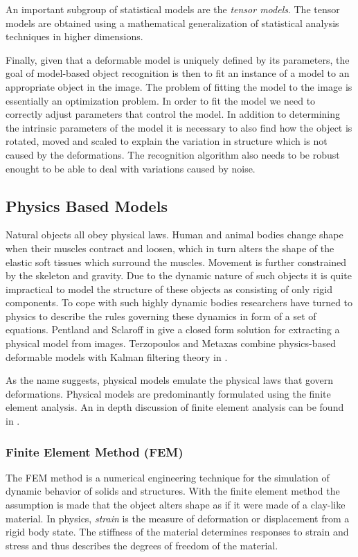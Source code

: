 \documentclass[11pt,a4paper,twoside]{report}
\begin{document}
An important subgroup of statistical models are the \textit{tensor models}. The
tensor models are obtained using a mathematical generalization of statistical analysis
techniques in higher dimensions.

Finally, given that a deformable model is uniquely defined by its parameters,
 the goal of model-based object recognition is then to fit an instance of a model to
an appropriate object in the image. The problem of fitting the model to the
image is essentially an optimization problem. In order to fit the model we need to
correctly adjust parameters that control the model. In addition to determining
the intrinsic parameters of the model it is necessary to also find how the
object is rotated, moved and scaled to explain the variation in structure which
is not caused by the deformations. The recognition algorithm also needs to be
robust enought to be able to deal with variations caused by noise.

\subsection{Physics Based Models}
Natural objects all obey physical laws. Human and animal bodies change shape
when their muscles contract and loosen, which in turn alters the shape of the
elastic soft tissues which surround the muscles. Movement is further constrained
by the skeleton and gravity. Due to the dynamic nature of such objects it is quite impractical to
model the structure of these objects as consisting of only rigid components. To cope with
such highly dynamic bodies researchers have turned to physics to describe the
rules governing these dynamics in form of a set of equations. Pentland and
Sclaroff in  \cite{FEM1pen} give a closed form solution for extracting a
physical model from images. Terzopoulos and Metaxas combine physics-based
deformable models with Kalman filtering theory in \cite{FEM1ter}.  

As the name suggests, physical models emulate the physical laws that govern
deformations. Physical models are predominantly formulated using the finite
element analysis. An in depth discussion of finite element
analysis can be found in \cite{FEMbook}.

\subsubsection{Finite Element Method (FEM)}
The FEM method is a numerical engineering technique for the simulation of dynamic
behavior of solids and structures. With the finite element method the assumption is made that
the object alters shape as if it were made of a clay-like material. In physics,
\textit{strain} is the measure of deformation or displacement from a rigid body state. The stiffness
of the material determines responses to strain and stress and thus describes the
degrees of freedom of the material.
\end{document}
